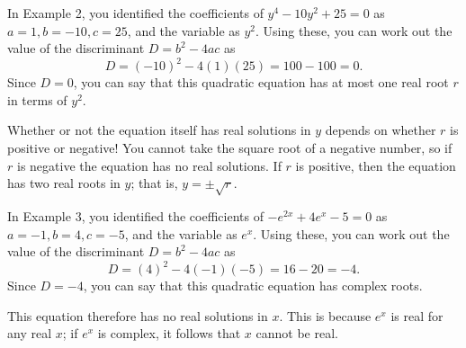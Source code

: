 \documentclass[
  12pt,
  a4paper, oneside]{starmastarticle}
\begin{document}
\begin{tcolorbox}[enhanced jigsaw, bottomrule=.15mm, colback=white, opacityback=0, rightrule=.15mm, breakable, left=2mm, arc=.35mm, toprule=.15mm, colframe=quarto-callout-note-color-frame, leftrule=.75mm]
\begin{minipage}[t]{5.5mm}
\textcolor{quarto-callout-note-color}{\faInfo}
\end{minipage}%
\begin{minipage}[t]{\textwidth - 5.5mm}
In Example 2, you identified the coefficients of
\(y^4 - 10y^2 + 25 = 0\) as \(a = 1, b = -10, c = 25\), and the variable
as \(y^2\). Using these, you can work out the value of the discriminant
\(D = b^2 - 4ac\) as \[D = (-10)^2 - 4(1)(25) = 100 - 100 = 0.\] Since
\(D = 0\), you can say that this quadratic equation has at most one real
root \(r\) in terms of \(y^2\).

Whether or not the equation itself has real solutions in \(y\) depends
on whether \(r\) is positive or negative! You cannot take the square
root of a negative number, so if \(r\) is negative the equation has no
real solutions. If \(r\) is positive, then the equation has two real
roots in \(y\); that is, \(y = \pm\sqrt{r}\).\end{minipage}%
\end{tcolorbox}

\begin{tcolorbox}[enhanced jigsaw, bottomrule=.15mm, colback=white, opacityback=0, rightrule=.15mm, breakable, left=2mm, arc=.35mm, toprule=.15mm, colframe=quarto-callout-note-color-frame, leftrule=.75mm]
\begin{minipage}[t]{5.5mm}
\textcolor{quarto-callout-note-color}{\faInfo}
\end{minipage}%
\begin{minipage}[t]{\textwidth - 5.5mm}
In Example 3, you identified the coefficients of
\(-e^{2x} + 4e^{x} - 5 = 0\) as \(a = -1, b = 4, c = -5\), and the
variable as \(e^{x}\). Using these, you can work out the value of the
discriminant \(D = b^2 - 4ac\) as
\[D = (4)^2 - 4(-1)(-5) = 16 - 20 = -4.\] Since \(D = -4\), you can say
that this quadratic equation has complex roots.

This equation therefore has no real solutions in \(x\). This is because
\(e^x\) is real for any real \(x\); if \(e^x\) is complex, it follows
that \(x\) cannot be real.\end{minipage}%
\end{tcolorbox}
\end{document}
